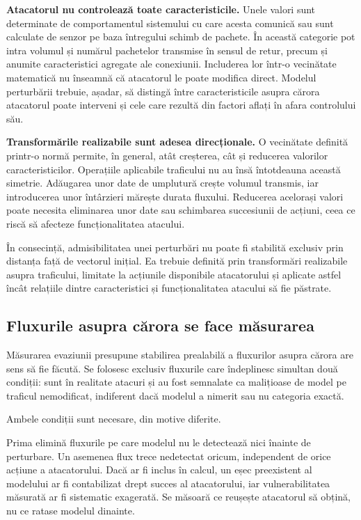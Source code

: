 \textbf{Atacatorul nu controlează toate caracteristicile.}
Unele valori sunt determinate de comportamentul sistemului cu care acesta comunică sau sunt calculate de senzor pe baza întregului schimb de pachete. În această categorie pot intra volumul și numărul pachetelor transmise în sensul de retur, precum și anumite caracteristici agregate ale conexiunii. Includerea lor într-o vecinătate matematică nu înseamnă că atacatorul le poate modifica direct. Modelul perturbării trebuie, așadar, să distingă între caracteristicile asupra cărora atacatorul poate interveni și cele care rezultă din factori aflați în afara controlului său.

\textbf{Transformările realizabile sunt adesea direcționale.}
O vecinătate definită printr-o normă permite, în general, atât creșterea, cât și reducerea valorilor caracteristicilor. Operațiile aplicabile traficului nu au însă întotdeauna această simetrie. Adăugarea unor date de umplutură crește volumul transmis, iar introducerea unor întârzieri mărește durata fluxului. Reducerea acelorași valori poate necesita eliminarea unor date sau schimbarea succesiunii de acțiuni, ceea ce riscă să afecteze funcționalitatea atacului.

În consecință, admisibilitatea unei perturbări nu poate fi stabilită exclusiv prin distanța față de vectorul inițial. Ea trebuie definită prin transformări realizabile asupra traficului, limitate la acțiunile disponibile atacatorului și aplicate astfel încât relațiile dintre caracteristici și funcționalitatea atacului să fie păstrate.

\subsection{Fluxurile asupra cărora se face măsurarea}\label{subsec:eligibil}

Măsurarea evaziunii presupune stabilirea prealabilă a fluxurilor asupra cărora are sens să fie făcută. Se folosesc exclusiv fluxurile care îndeplinesc simultan două condiții: sunt în realitate atacuri și au fost semnalate ca malițioase de model pe traficul nemodificat, indiferent dacă modelul a nimerit sau nu categoria exactă.

Ambele condiții sunt necesare, din motive diferite.

Prima elimină fluxurile pe care modelul nu le detectează nici înainte de perturbare. Un asemenea flux trece nedetectat oricum, independent de orice acțiune a atacatorului. Dacă ar fi inclus în calcul, un eșec preexistent al modelului ar fi contabilizat drept succes al atacatorului, iar vulnerabilitatea măsurată ar fi sistematic exagerată. Se măsoară ce reușește atacatorul să obțină, nu ce ratase modelul dinainte.

